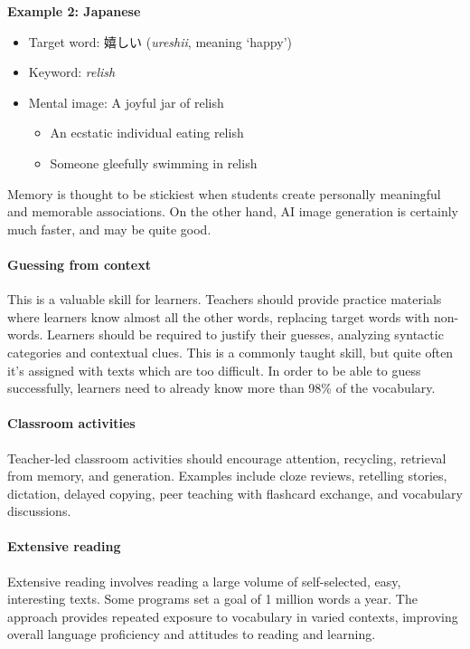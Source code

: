 \begin{tcolorbox}[title=Keyword Technique Examples, colback=white, colframe=blue!75!black, fonttitle=\bfseries]
\textbf{Example 2: Japanese}
\begin{itemize}
    \item Target word: 嬉しい (\textit{ureshii}, meaning `happy')
    \item Keyword: \textit{relish}
    \item Mental image: A joyful jar of relish
    \begin{itemize}
        \item An ecstatic individual eating relish
        \item Someone gleefully swimming in relish 
    \end{itemize}
\end{itemize}

Memory is thought to be stickiest when students create personally meaningful and memorable associations. On the other hand, AI image generation is certainly much faster, and may be quite good.
\end{tcolorbox}
\newpage
\paragraph*{Guessing from context} This is a valuable skill for learners. Teachers should provide practice materials where learners know almost all the other words, replacing target words with non-words. Learners should be required to justify their guesses, analyzing syntactic categories and contextual clues. This is a commonly taught skill, but quite often it's assigned with texts which are too difficult. In order to be able to guess successfully, learners need to already know more than 98\% of the vocabulary.

\paragraph*{Classroom activities} Teacher-led classroom activities should encourage attention, recycling, retrieval from memory, and generation. Examples include cloze reviews, retelling stories, dictation, delayed copying, peer teaching with flashcard exchange, and vocabulary discussions.

\paragraph*{Extensive reading} Extensive reading involves reading a large volume of self-selected, easy, interesting texts. Some programs set a goal of 1 million words a year. The approach provides repeated exposure to vocabulary in varied contexts, improving overall language proficiency and attitudes to reading and learning.

